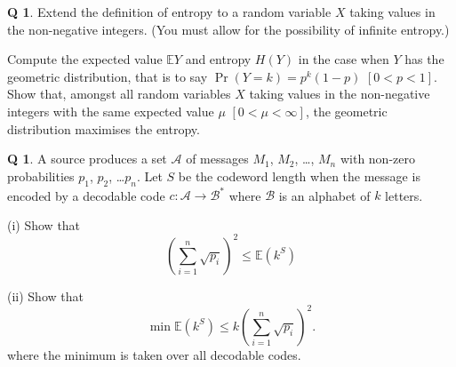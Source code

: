 \documentclass[12pt,a4paper]{article}
\theoremstyle{plain}
\theoremstyle{definition}
\newtheorem{question}[theorem]{Q}
\begin{document}
    \begin{question}
        \label{C1.14} Extend the definition of entropy to
        a random variable $X$ taking values in the non-negative
        integers. (You must allow for the possibility
        of infinite entropy.)

        Compute the expected value ${\mathbb E}Y$ and
        entropy $H(Y)$ in the case when $Y$ has the geometric
        distribution, that is to say
        $\Pr(Y=k)=p^{k}(1-p)$
        $[0<p<1]$. Show that, amongst all random variables
        $X$ taking values in the non-negative
        integers with the same expected value $\mu$ $[0<\mu<\infty]$,
        the geometric distribution maximises the entropy.
    \end{question}
    \begin{question}
        \label{C1.15} A source produces a set ${\mathcal A}$
        of messages
        $M_{1}$, $M_{2}$,
        \dots, $M_{n}$ with non-zero probabilities $p_{1}$, $p_{2}$,
        \dots $p_{n}$. Let $S$ be the codeword length when the message
        is encoded by a decodable code $c:{\mathcal A}\rightarrow{\mathcal B}^{*}$
        where ${\mathcal B}$ is an alphabet of $k$ letters.

        (i) Show that
        \[\left(\sum_{i=1}^{n}\sqrt{p_{i}}\right)^{2}
        \leq {\mathbb E}(k^{S})\]

        \noindent[Hint: Cauchy--Schwarz,
        $p_{i}^{1/2}=p_{i}^{1/2}k^{s_{i}/2}k^{-s_{i}/2}$.]

        (ii) Show that
        \[\min{\mathbb E}(k^{S})\leq
        k\left(\sum_{i=1}^{n}\sqrt{p_{i}}\right)^{2}.\]
        where the minimum is taken over all decodable codes.

        \noindent[Hint: Look for a code with codeword lengths
        $s_{i}=\lceil -\log_{k} p_{i}^{1/2}/\lambda\rceil$ for
        an appropriate $\lambda$.]
    \end{question}
    \newpage
\end{document}
